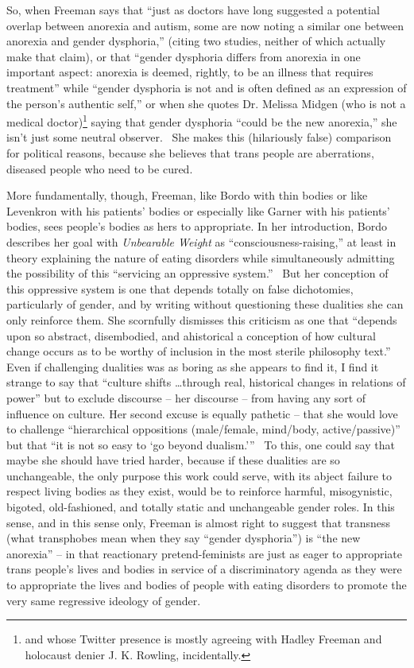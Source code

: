 \documentclass[11pt]{article}
\begin{document}
    So, when Freeman says that ``just as doctors have long suggested a potential overlap between anorexia and autism, some are now noting a similar one between anorexia and gender dysphoria,'' (citing two studies, neither of which actually make that claim), or that ``gender dysphoria differs from anorexia in one important aspect: anorexia is deemed, rightly, to be an illness that requires treatment'' while ``gender dysphoria is not and is often defined as an expression of the person's authentic self,'' or when she quotes Dr. Melissa Midgen (who is not a medical doctor)\footnote{and whose Twitter presence is mostly agreeing with Hadley Freeman and holocaust denier J. K. Rowling, incidentally.} saying that gender dysphoria ``could be the new anorexia,'' she isn't just some neutral observer.~\autocite[idk which page -- I got the ebook]{Freeman23} She makes this (hilariously false) comparison for political reasons, because she believes that trans people are aberrations, diseased people who need to be cured. 

    More fundamentally, though, Freeman, like Bordo with thin bodies or like Levenkron with his patients' bodies or especially like Garner with his patients' bodies, sees people's bodies as hers to appropriate. In her introduction, Bordo describes her goal with \textit{Unbearable Weight} as ``consciousness-raising,'' at least in theory explaining the nature of eating disorders while simultaneously admitting the possibility of this ``servicing an oppressive system.''~\autocite[31]{Bordo03} But her conception of this oppressive system is one that depends totally on false dichotomies, particularly of gender, and by writing without questioning these dualities she can only reinforce them. She scornfully dismisses this criticism as one that ``depends upon so abstract, disembodied, and ahistorical a conception of how cultural change occurs as to be worthy of inclusion in the most sterile philosophy text.'' Even if challenging dualities was as boring as she appears to find it, I find it strange to say that ``culture shifts \dots through real, historical changes in relations of power'' but to exclude discourse -- her discourse -- from having any sort of influence on culture. Her second excuse is equally pathetic -- that she would love to challenge ``hierarchical oppositions (male/female, mind/body, active/passive)'' but that ``it is not so easy to `go beyond dualism.'''~\autocite[15]{Bordo03} To this, one could say that maybe she should have tried harder, because if these dualities are so unchangeable, the only purpose this work could serve, with its abject failure to respect living bodies as they exist, would be to reinforce harmful, misogynistic, bigoted, old-fashioned, and totally static and unchangeable gender roles. In this sense, and in this sense only, Freeman is almost right to suggest that transness (what transphobes mean when they say ``gender dysphoria'') is ``the new anorexia'' -- in that reactionary pretend-feminists are just as eager to appropriate trans people's lives and bodies in service of a discriminatory agenda as they were to appropriate the lives and bodies of people with eating disorders to promote the very same regressive ideology of gender.
\end{document}
